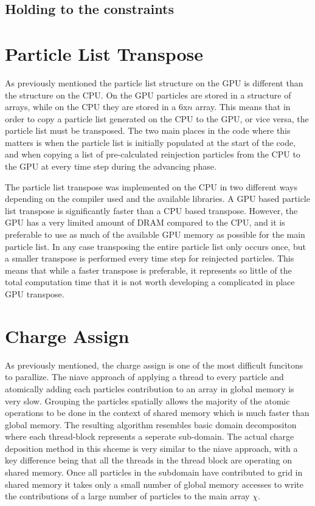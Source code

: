 		\subsection{Holding to the constraints}

	\section{Particle List Transpose}
As previously mentioned the particle list structure on the GPU is different than the structure on the CPU. On the GPU particles are stored in a structure of arrays, while on the CPU they are stored in a 6x$n$ array. This means that in order to copy a particle list generated on the CPU to the GPU, or vice versa, the particle list must be transposed. The two main places in the code where this matters is when the particle list is initially populated at the start of the code, and when copying a list of pre-calculated reinjection particles from the CPU to the GPU at every time step during the advancing phase.

The particle list transpose was implemented on the CPU in two different ways depending on the compiler used and the available libraries. A GPU based particle list transpose is significantly faster than a CPU based transpose. However, the GPU has a very limited amount of DRAM compared to the CPU, and it is preferable to use as much of the available GPU memory as possible for the main particle list. In any case transposing the entire particle list only occurs once, but a smaller transpose is performed every time step for reinjected particles. This means that while a faster transpose is preferable, it represents so little of the total computation time that it is not worth developing a complicated in place GPU transpose.  

	\section{Charge Assign}
	\label{sec:charge_assign}
	As previously mentioned, the charge assign is one of the most difficult funcitons to parallize. The niave approach of applying a thread to every particle and atomically adding each particles contribution to an array in global memory is very slow. Grouping the particles spatially allows the majority of the atomic operations to be done in the context of shared memory which is much faster than global memory. The resulting algorithm resembles basic domain decompositon where each thread-block represents a seperate sub-domain. The actual charge deposition method in this shceme is very similar to the niave approach, with a key difference being that all the threads in the thread block are operating on shared memory. Once all particles in the subdomain have contributed to grid in shared memory it takes only a small number of global memory accesses to write the contributions of a large number of particles to the main array $\chi$. 

